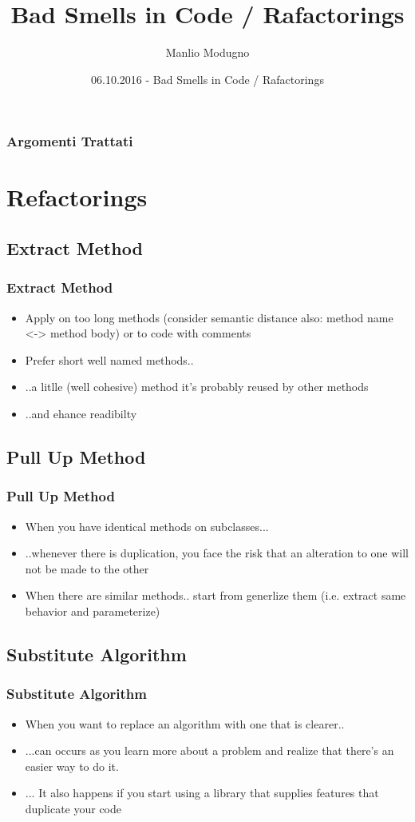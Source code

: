 \documentclass{beamer}
\title{Bad Smells in Code / Rafactorings}
\author{Manlio Modugno}
\institute[GMTechnologies]
\date[06.10.2016] 
{06.10.2016 - Bad Smells in Code / Rafactorings}
\begin{document}
\begin{frame}
  \titlepage
\end{frame}

\begin{frame}
  \frametitle{Argomenti Trattati}
  \tableofcontents
\end{frame}

\section{Refactorings}
\subsection{Extract Method}
\begin{frame}
  \frametitle{Extract Method}
  \begin{itemize}
	\item<+-> Apply on too long methods (consider semantic distance also: method name <-> method body) or to code with comments
	\item<+-> Prefer short well named methods..
	\item<+-> ..a litlle (well cohesive) method it's probably reused by other methods
    \item<+-> ..and ehance readibilty
  \end{itemize}
\end{frame}

\subsection{Pull Up Method}
\begin{frame}
  \frametitle{Pull Up Method}
  \begin{itemize}
	\item<+-> When you have identical methods on subclasses...
	\item<+-> ..whenever there is duplication, you face the risk that an alteration to one will not be made to the other
	\item<+-> When there are similar methods.. start from generlize them (i.e. extract same behavior and parameterize)
  \end{itemize}
\end{frame}

\subsection{Substitute Algorithm}
\begin{frame}
  \frametitle{Substitute Algorithm}
  \begin{itemize}
	\item<+-> When you want to replace an algorithm with one that is clearer..
	\item<+-> ...can occurs as you learn more about a problem and realize that there's an easier way to do it.
	\item<+-> ... It also happens if you start using a library that supplies features that duplicate your code
  \end{itemize}
\end{frame}
\end{document}
